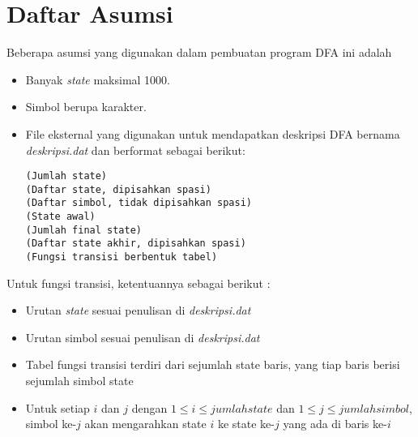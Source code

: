 \section{Daftar Asumsi}
\label{sec:asumsi}
Beberapa asumsi yang digunakan dalam pembuatan program DFA ini adalah
\begin{itemize}
  \item Banyak \textit{state} maksimal 1000.
  \item Simbol berupa karakter.
  \item File eksternal yang digunakan untuk mendapatkan deskripsi DFA bernama \textit{deskripsi.dat} dan berformat sebagai berikut:

  \begin{lstlisting}[frame=single]
(Jumlah state)
(Daftar state, dipisahkan spasi)
(Daftar simbol, tidak dipisahkan spasi)
(State awal)
(Jumlah final state)
(Daftar state akhir, dipisahkan spasi)
(Fungsi transisi berbentuk tabel)
\end{lstlisting}
\end{itemize}
Untuk fungsi transisi, ketentuannya sebagai berikut :
\begin{itemize}
  \item Urutan \textit{state} sesuai penulisan di \textit{deskripsi.dat}
  \item Urutan simbol sesuai penulisan di \textit{deskripsi.dat}
  \item Tabel fungsi transisi terdiri dari sejumlah state baris, yang tiap baris berisi sejumlah simbol state
  \item Untuk setiap $i$ dan $j$ dengan $1 \leq i \leq jumlah state$ dan $1 \leq j \leq jumlah simbol$, simbol ke-$j$ akan mengarahkan state $i$ ke state ke-$j$ yang ada di baris ke-$i$
\end{itemize}
